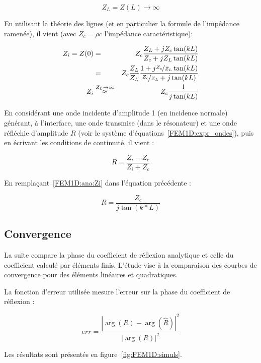 \begin{equation}
	Z_L = Z(L) \rightarrow \infty \label{FEM1D:ana:ZL}
\end{equation}

En utilisant la théorie des lignes (et en particulier la formule de l'impédance ramenée), il vient (avec $Z_c =
\rho c$ l'impédance caractéristique):

\begin{eqnarray}
	Z_i = Z(0) 	& = & Z_c \frac{Z_L+jZ_c\tan(kL)}{Z_c + jZ_L\tan(kL)}\notag\\
			    & = & Z_c \frac{Z_L}{Z_L}\frac{1+j\nicefrac{Z_c}{Z_L}\tan(kL)}{\nicefrac{Z_c}{Z_L} + j\tan(kL)}\notag\\
		    Z_i & \overset{Z_L\rightarrow\infty}{\approx} & Z_c\frac{1}{j\tan(kL)}\label{FEM1D:ana:Zi}
\end{eqnarray}

En considérant une onde incidente d'amplitude 1 (en incidence normale) générant, à l'interface, une onde transmise (dans le
résonateur) et une onde réfléchie d'amplitude $R$ (voir le système d'équations~\eqref{FEM1D:expr_ondes}), puis en écrivant les
conditions de continuité, il vient :

\begin{equation*}
	R = \frac{Z_i-Z_c}{Z_i+Z_c}
\end{equation*}

En remplaçant~\eqref{FEM1D:ana:Zi} dans l'équation précédente :

\begin{equation}
	R = \frac{Z_c}{j\tan(k*L)}\label{FEM1D:ana:R}
\end{equation}

\subsection{Convergence}

La suite compare la phase du coefficient de réflexion analytique et celle du coefficient calculé par éléments
finis. L'étude vise à la comparaison des courbes de convergence pour des éléments linéaires et quadratiques.

La fonction d'erreur utilisée mesure l'erreur sur la phase du coefficient de réflexion :

\[
	err = \frac{\left|\arg(R) - \arg(\hat{R})\right|^2}{\left|\arg(R)\right|^2}
\]


Les résultats sont présentés en figure~\ref{fig:FEM1D:simuls}.

